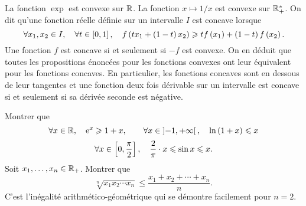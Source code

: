 \documentclass{magnolia}
\begin{document}
\begin{remarques}
\remarque La fonction $\exp$ est convexe sur $\mathbb{R}$. La fonction $x\mapsto 1/x$
  est convexe sur $\mathbb{R}_+^*$.
\remarque On dit qu'une fonction réelle définie sur un intervalle $I$ est
  concave lorsque
  \[\forall x_1,x_2\in I ,\quad \forall t\in\left[0,1\right] ,\quad
    f\left(tx_1+\left(1-t\right)x_2\right)\geqslant tf\left(x_1\right)+\left(1-t\right)f\left(x_2\right).\]
  Une fonction $f$ est concave si et seulement si $-f$ est convexe. On en déduit
  que toutes les propositions énoncées pour les fonctions convexes ont leur
  équivalent pour les fonctions concaves. En particulier, les fonctions
  concaves sont en dessous de leur tangentes et une fonction deux fois
  dérivable sur un intervalle est concave si et seulement si sa dérivée
  seconde est négative.
\end{remarques}

\begin{exos}
\exo Montrer que
  \[\forall x\in\mathbb{R} ,\quad {\rm e}^x \geqslant 1+x, \qquad \forall x\in\left]-1,+\infty\right[
    ,\quad \ln\left(1+x\right)\leqslant x\]
  \[\forall x\in\left[0,\frac{\pi}{2}\right] ,\quad
    \frac{2}{\pi}\cdot x\leqslant\sin x\leqslant x.\]
\exo Soit $x_1,\ldots,x_n\in\mathbb{R}_+$. Montrer que
  \[\sqrt[n]{x_1 x_2\cdots x_n}\leq\frac{x_1+x_2+\cdots+x_n}{n}.\]
  C'est l'inégalité arithmético-géométrique qui se démontre facilement pour
  $n=2$.
\end{exos}
\end{document}
